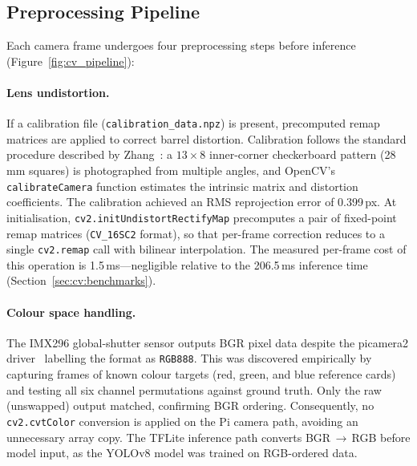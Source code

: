 \subsection{Preprocessing Pipeline}\label{sec:cv:preproc}

Each camera frame undergoes four preprocessing steps before inference (Figure~\ref{fig:cv_pipeline}):

\paragraph{Lens undistortion.}
If a calibration file (\texttt{calibration\_data.npz}) is present, precomputed remap matrices are applied to correct barrel distortion. Calibration follows the standard procedure described by Zhang~\cite{lens_calibration}: a $13\times8$ inner-corner checkerboard pattern (28\,mm squares) is photographed from multiple angles, and OpenCV's \texttt{calibrateCamera} function estimates the intrinsic matrix and distortion coefficients. The calibration achieved an RMS reprojection error of 0.399\,px. At initialisation, \texttt{cv2.initUndistortRectifyMap} precomputes a pair of fixed-point remap matrices (\texttt{CV\_16SC2} format), so that per-frame correction reduces to a single \texttt{cv2.remap} call with bilinear interpolation. The measured per-frame cost of this operation is 1.5\,ms---negligible relative to the 206.5\,ms inference time (Section~\ref{sec:cv:benchmarks}).

\paragraph{Colour space handling.}
The IMX296 global-shutter sensor outputs BGR pixel data despite the picamera2 driver~\cite{picamera2} labelling the format as \texttt{RGB888}. This was discovered empirically by capturing frames of known colour targets (red, green, and blue reference cards) and testing all six channel permutations against ground truth. Only the raw (unswapped) output matched, confirming BGR ordering. Consequently, no \texttt{cv2.cvtColor} conversion is applied on the Pi camera path, avoiding an unnecessary array copy. The TFLite inference path converts BGR\,$\rightarrow$\,RGB before model input, as the YOLOv8 model was trained on RGB-ordered data.

